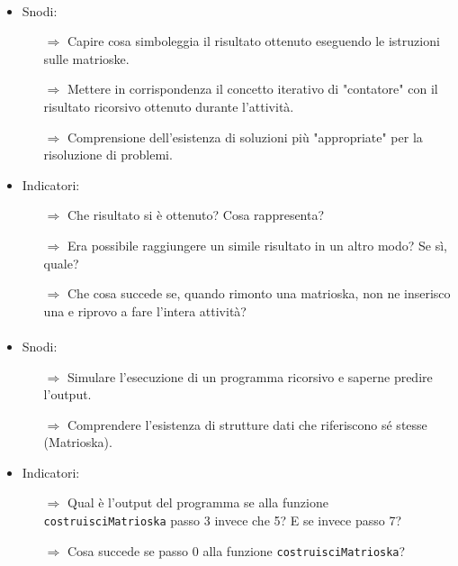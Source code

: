 \paragraph{}

\begin{itemize}
    \item Snodi:
    \begin{itemize}
        \item [$\Rightarrow$] Capire cosa simboleggia il risultato ottenuto eseguendo le istruzioni sulle matrioske.
        \item [$\Rightarrow$] Mettere in corrispondenza il concetto iterativo di "contatore" con il risultato
        ricorsivo ottenuto durante l'attività.
        \item [$\Rightarrow$] Comprensione dell'esistenza di soluzioni più "appropriate" per la risoluzione di problemi.
    \end{itemize}
    \item Indicatori:
    \begin{itemize}
        \item [$\Rightarrow$] Che risultato si è ottenuto? Cosa rappresenta?
        \item [$\Rightarrow$] Era possibile raggiungere un simile risultato in un altro modo? Se sì, quale?
        \item [$\Rightarrow$] Che cosa succede se, quando rimonto una matrioska, non ne inserisco una e riprovo a fare l'intera attività?
    \end{itemize}
\end{itemize}

\paragraph{}

\begin{itemize}
    \item Snodi:
    \begin{itemize}
        \item [$\Rightarrow$] Simulare l'esecuzione di un programma ricorsivo e saperne predire l'output.
        \item [$\Rightarrow$] Comprendere l'esistenza di strutture dati che riferiscono sé stesse (Matrioska).
    \end{itemize}
    \item Indicatori:
    \begin{itemize}
        \item [$\Rightarrow$] Qual è l'output del programma se alla funzione \texttt{costruisciMatrioska} 
        passo 3 invece che 5? E se invece passo 7?
        \item [$\Rightarrow$] Cosa succede se passo 0 alla funzione \texttt{costruisciMatrioska}?
    \end{itemize}
\end{itemize}

